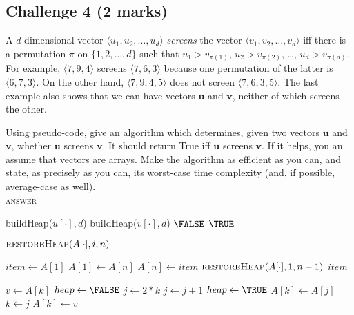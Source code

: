 \documentclass[11pt]{article}
\newcommand{\tuple}[1]{\langle #1 \rangle}
\begin{document}
\subsection*{Challenge 4 \hfill {\small (2 marks)}}

A $d$-dimensional vector $\tuple{u_1,u_2,\ldots,u_d}$ \emph{screens}
the vector $\tuple{v_1,v_2,\ldots,v_d}$ iff there is a permutation
$\pi$ on $\{1,2,\ldots,d\}$ such that
$u_1 > v_{\pi(1)}$,
$u_2 > v_{\pi(2)}$,
\ldots,
$u_d > v_{\pi(d)}$.
For example, $\tuple{7,9,4}$ screens $\tuple{7,6,3}$
because one permutation of the latter is $\tuple{6,7,3}$.
On the other hand, $\tuple{7,9,4,5}$ does not screen $\tuple{7,6,3,5}$.
The last example also shows that we can have vectors
$\mathbf{u}$ and $\mathbf{v}$, neither of which screens the other.

Using pseudo-code,
give an algorithm which determines, given two vectors $\mathbf{u}$
and $\mathbf{v}$, whether $\mathbf{u}$ screens $\mathbf{v}$.
It should return True iff $\mathbf{u}$ screens $\mathbf{v}$.
If it helps, you an assume that vectors are arrays.
Make the algorithm as efficient as you can, and state,
as precisely as you can, its worst-case time complexity
(and, if possible, average-case as well).
\\
\textsc{answer}
\par
\begin{algorithmic}
    \State buildHeap($u[\cdot], d$)
    \State buildHeap($v[\cdot], d$)
        \State \Return $\FALSE$
      \EndIf
    \EndFor
    \State \Return $\TRUE$
  \EndFunction

      \State $\Call{restoreHeap}{A[\cdot], i, n}$
    \EndFor
  \EndFunction

    \State $item \gets A[1]$
    \State $A[1] \gets A[n]$
    \State $A[n] \gets item$
    \State $\Call{restoreHeap}{A[\cdot], 1, n-1}$
    \State \Return $item$
  \EndFunction

    \State $v \gets A[k]$
    \State $heap \gets \FALSE$
      \State $j \gets 2 * k$
        \State $j \gets j+1$
      \EndIf
        \State $heap \gets \TRUE$
      \Else
        \State $A[k] \gets A[j]$
        \State $k \gets j$
      \EndIf
    \EndWhile
    \State $A[k] \gets v$
  \EndFunction

\end{algorithmic}
\end{document}
